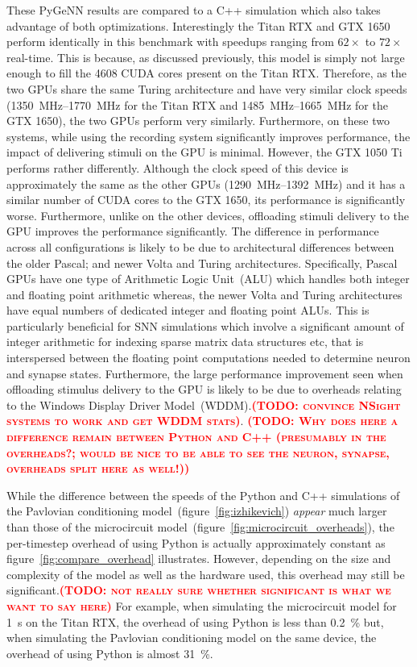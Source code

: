 \documentclass[utf8]{frontiersSCNS} %
\newcommand{\todo}[1]{\textbf{\textsc{\textcolor{red}{(TODO: #1)}}}}
\begin{document}
These PyGeNN results are compared to a C++ simulation which also takes advantage of both optimizations.
Interestingly the Titan RTX and GTX 1650 perform identically in this benchmark with speedups ranging from $62\times$ to $72\times$ real-time.
This is because, as discussed previously, this model is simply not large enough to fill the \num{4608} CUDA cores present on the Titan RTX.
Therefore, as the two GPUs share the same Turing architecture and have very similar clock speeds (\SIrange{1350}{1770}{\mega\hertz} for the Titan RTX and \SIrange{1485}{1665}{\mega\hertz} for the GTX 1650), the two GPUs perform very similarly.
Furthermore, on these two systems, while using the recording system significantly improves performance, the impact of delivering stimuli on the GPU is minimal.
However, the GTX 1050 Ti performs rather differently. 
Although the clock speed of this device is approximately the same as the other GPUs (\SIrange{1290}{1392}{\mega\hertz}) and it has a similar number of CUDA cores to the GTX 1650, its performance is significantly worse.
Furthermore, unlike on the other devices, offloading stimuli delivery to the GPU improves the performance significantly.
The difference in performance across all configurations is likely to be due to architectural differences between the older Pascal; and newer Volta and Turing architectures.
Specifically, Pascal GPUs have one type of Arithmetic Logic Unit~(ALU) which handles both integer and floating point arithmetic whereas, the newer Volta and Turing architectures have equal numbers of dedicated integer and floating point ALUs.
This is particularly beneficial for SNN simulations which involve a significant amount of integer arithmetic for indexing sparse matrix data structures etc, that is interspersed between the floating point computations needed to determine neuron and synapse states.
Furthermore, the large performance improvement seen when offloading stimulus delivery to the GPU is likely to be due to overheads relating to the Windows Display Driver Model~(WDDM).\todo{convince NSight systems to work and get WDDM stats}.
\todo{Why does here a difference remain between Python and C++ (presumably in the overheads?; would be nice to be able to see the neuron, synapse, overheads split here as well!)}

While the difference between the speeds of the Python and C++ simulations of the Pavlovian conditioning model~(figure~\ref{fig:izhikevich}) \emph{appear} much larger than those of the microcircuit model~(figure~\ref{fig:microcircuit_overheads}), the per-timestep overhead of using Python is actually approximately constant as figure~\ref{fig:compare_overhead} illustrates.
However, depending on the size and complexity of the model as well as the hardware used, this overhead may still be significant.\todo{not really sure whether significant is what we want to say here}
For example, when simulating the microcircuit model for \SI{1}{\second} on the Titan RTX, the overhead of using Python is less than \SI{0.2}{\percent} but, when simulating the Pavlovian conditioning model on the same device, the overhead of using Python is almost \SI{31}{\percent}.
\end{document}
